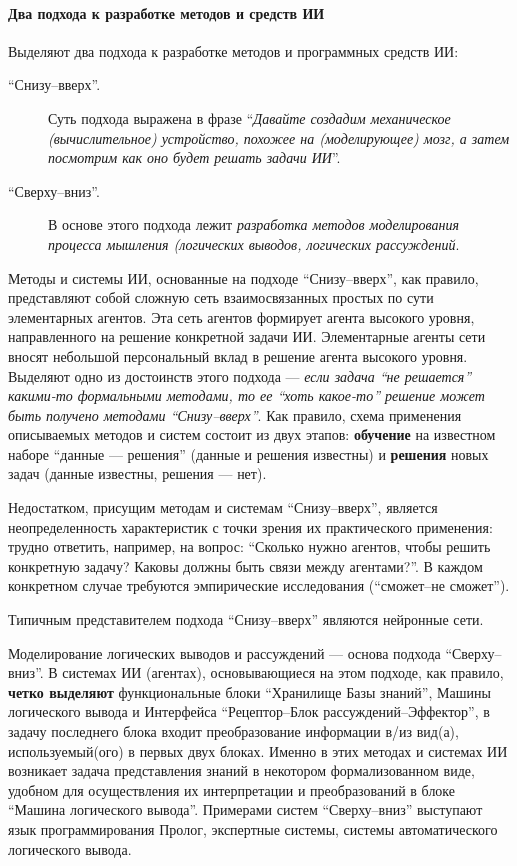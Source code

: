 \documentclass[12pt, openany, twoside]{book} %
\def\rem#1{}
\newenvironment{mygroup}{}{}
\begin{document}
\paragraph{Два подхода к разработке методов и средств ИИ}
\begin{mygroup}
\small\sf
Выделяют два подхода к разработке методов и программных средств ИИ:
\begin{description}
\item[``Снизу--вверх''.] Суть подхода выражена в фразе ``{\em Давайте создадим механическое (вычислительное) устройство, похожее на (моделирующее) мозг, а затем посмотрим как оно будет решать задачи ИИ}''.
\item[``Сверху--вниз''.] В основе этого подхода лежит {\em разработка методов моделирования процесса мышления (логических выводов, логических рассуждений}.
\end{description}

Методы и системы ИИ, основанные на подходе ``Снизу--вверх'', как правило, представляют собой сложную сеть взаимосвязанных простых по сути элементарных агентов. Эта сеть агентов формирует агента высокого уровня, направленного на решение конкретной задачи ИИ. Элементарные агенты сети вносят небольшой персональный вклад в решение агента высокого уровня. Выделяют одно из достоинств этого подхода --- {\em если задача ``не решается'' какими-то формальными методами, то ее ``хоть какое-то'' решение может быть получено методами ``Снизу--вверх''}. Как правило, схема применения описываемых методов и систем состоит из двух этапов: {\bf обучение} на известном наборе ``данные --- решения'' (данные и решения известны) и {\bf решения} новых задач (данные известны, решения --- нет).

Недостатком, присущим методам и системам ``Снизу--вверх'', является неопределенность характеристик с точки зрения их практического применения: трудно ответить, например, на вопрос: ``Сколько нужно агентов, чтобы решить конкретную задачу? Каковы должны быть связи между агентами?''. В каждом конкретном случае требуются эмпирические исследования (``сможет--не сможет'').

Типичным представителем подхода ``Снизу--вверх'' являются нейронные сети.

Моделирование логических выводов и рассуждений --- основа подхода ``Сверху--вниз''. В системах ИИ (агентах), основывающиеся на этом подходе, как правило, {\bf четко выделяют} функциональные блоки ``Хранилище Базы знаний'', Машины логического вывода и Интерфейса ``Ре\-цеп\-тор--Блок рас\-суж\-де\-ний--Эффек\-тор'', в задачу последнего блока входит преобразование информации в/из вид(а), используемый(ого) в первых двух блоках. Именно в этих методах и системах ИИ возникает задача представления знаний в некотором формализованном виде, удобном для осуществления их интерпретации и преобразований в блоке ``Машина логического вывода''. Примерами\rem{\footnote{Мы не будем анализировать здесь достоинства и недостатки этих методов, т.к. все это будет изложено в пособии.}} систем ``Сверху--вниз'' выступают язык программирования Пролог, экспертные системы, системы автоматического логического вывода.

\end{mygroup}
\end{document}
